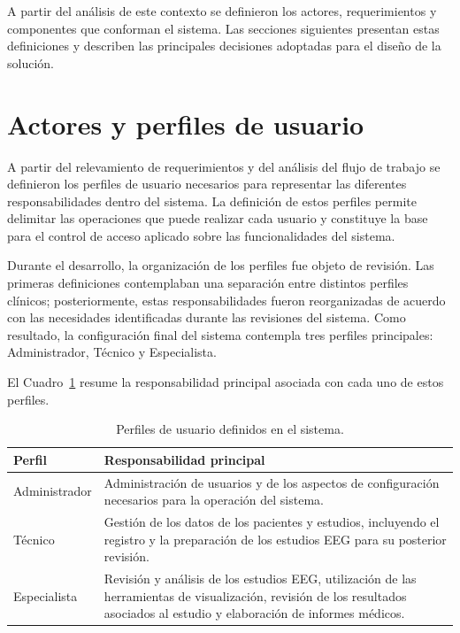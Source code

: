 A partir del análisis de este contexto se definieron los actores, requerimientos
y componentes que conforman el sistema. Las secciones siguientes presentan estas
definiciones y describen las principales decisiones adoptadas para el diseño de
la solución.

\section{Actores y perfiles de usuario}
\label{sec:actores-perfiles}

A partir del relevamiento de requerimientos y del análisis del flujo de trabajo
se definieron los perfiles de usuario necesarios para representar las
diferentes responsabilidades dentro del sistema. La definición de estos
perfiles permite delimitar las operaciones que puede realizar cada usuario y
constituye la base para el control de acceso aplicado sobre las funcionalidades
del sistema.

Durante el desarrollo, la organización de los perfiles fue objeto de revisión.
Las primeras definiciones contemplaban una separación entre distintos perfiles
clínicos; posteriormente, estas responsabilidades fueron reorganizadas de
acuerdo con las necesidades identificadas durante las revisiones del sistema.
Como resultado, la configuración final del sistema contempla tres perfiles
principales: Administrador, Técnico y Especialista.

El Cuadro~\ref{tab:perfiles-usuario} resume la responsabilidad principal
asociada con cada uno de estos perfiles.

\begin{table}[H]
    \centering
    \caption{Perfiles de usuario definidos en el sistema.}
    \label{tab:perfiles-usuario}
    \begin{tabular}{|p{}|p{}|}
        \hline
        \textbf{Perfil} & \textbf{Responsabilidad principal} \\
        \hline
        Administrador &
        Administración de usuarios y de los aspectos de configuración
        necesarios para la operación del sistema. \\
        \hline
        Técnico &
        Gestión de los datos de los pacientes y estudios,
        incluyendo el registro y la preparación de los estudios EEG para su
        posterior revisión. \\
        \hline
        Especialista &
        Revisión y análisis de los estudios EEG, utilización de las
        herramientas de visualización, revisión de los resultados asociados
        al estudio y elaboración de informes médicos. \\
        \hline
    \end{tabular}
\end{table}

